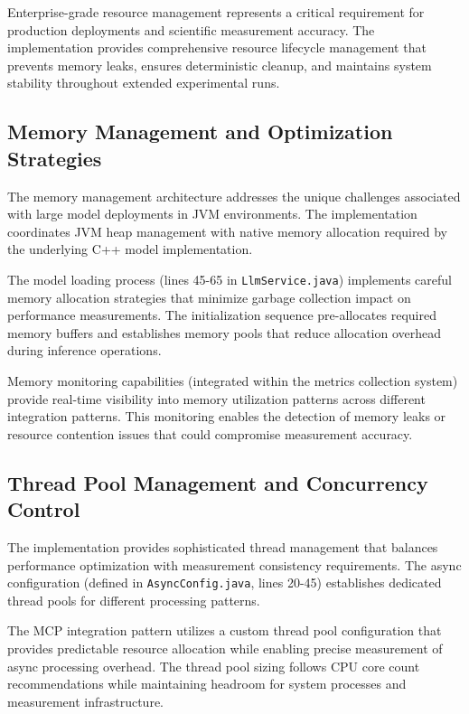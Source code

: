 Enterprise-grade resource management represents a critical requirement for production deployments and scientific measurement accuracy. The implementation provides comprehensive resource lifecycle management that prevents memory leaks, ensures deterministic cleanup, and maintains system stability throughout extended experimental runs.

\subsection{Memory Management and Optimization Strategies}

The memory management architecture addresses the unique challenges associated with large model deployments in JVM environments. The implementation coordinates JVM heap management with native memory allocation required by the underlying C++ model implementation.

The model loading process (lines 45-65 in \texttt{LlmService.java}) implements careful memory allocation strategies that minimize garbage collection impact on performance measurements. The initialization sequence pre-allocates required memory buffers and establishes memory pools that reduce allocation overhead during inference operations.


Memory monitoring capabilities (integrated within the metrics collection system) provide real-time visibility into memory utilization patterns across different integration patterns. This monitoring enables the detection of memory leaks or resource contention issues that could compromise measurement accuracy.

\subsection{Thread Pool Management and Concurrency Control}

The implementation provides sophisticated thread management that balances performance optimization with measurement consistency requirements. The async configuration (defined in \texttt{AsyncConfig.java}, lines 20-45) establishes dedicated thread pools for different processing patterns.


The MCP integration pattern utilizes a custom thread pool configuration that provides predictable resource allocation while enabling precise measurement of async processing overhead. The thread pool sizing follows CPU core count recommendations while maintaining headroom for system processes and measurement infrastructure.

